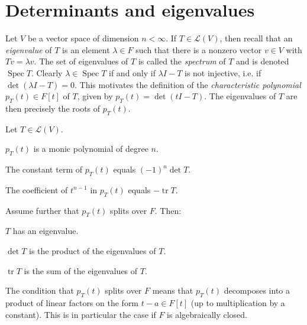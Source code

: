 \documentclass[article, a4paper, 11pt, oneside]{memoir}
\numberwithin{equation}{chapter}
\newcommand{\calL}{\mathcal{L}}
\DeclareMathOperator{\spec}{Spec}
\DeclareMathOperator{\trace}{tr}
\begin{document}
\section{Determinants and eigenvalues}

Let $V$ be a vector space of dimension $n < \infty$. If $T \in \calL(V)$, then recall that an \emph{eigenvalue} of $T$ is an element $\lambda \in F$ such that there is a nonzero vector $v \in V$ with $Tv = \lambda v$. The set of eigenvalues of $T$ is called the \emph{spectrum} of $T$ and is denoted $\spec T$. Clearly $\lambda \in \spec T$ if and only if $\lambda I - T$ is not injective, i.e. if $\det(\lambda I - T) = 0$. This motivates the definition of the \emph{characteristic polynomial} $p_T(t) \in F[t]$ of $T$, given by $p_T(t) = \det(tI - T)$. The eigenvalues of $T$ are then precisely the roots of $p_T(t)$.

\begin{proposition}
    Let $T \in \calL(V)$.
    \begin{enumprop}
        \item $p_T(t)$ is a monic polynomial of degree $n$.
        \item The constant term of $p_T(t)$ equals $(-1)^n \det T$.
        \item The coefficient of $t^{n-1}$ in $p_T(t)$ equals $-\trace T$.
    \end{enumprop}
    Assume further that $p_T(t)$ splits over $F$. Then:
    \begin{enumprop}[resume]
        \item $T$ has an eigenvalue.
        \item $\det T$ is the product of the eigenvalues of $T$.
        \item $\trace T$ is the sum of the eigenvalues of $T$.
    \end{enumprop}
\end{proposition}
%
The condition that $p_T(t)$ splits over $F$ means that $p_T(t)$ decomposes into a product of linear factors on the form $t - a \in F[t]$ (up to multiplication by a constant). This is in particular the case if $F$ is algebraically closed.
\end{document}
